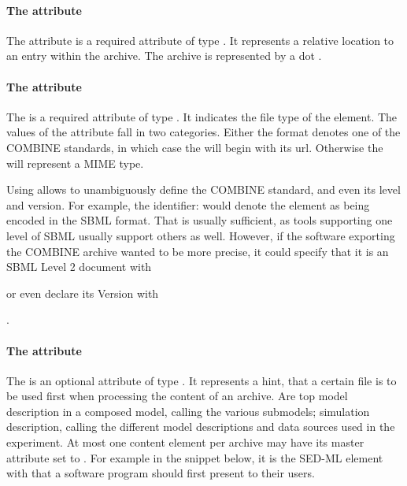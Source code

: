 \paragraph{The  attribute}
The  attribute is a required attribute of type 
. It represents a relative location to an entry within the 
archive. The archive is represented by a dot . 

\paragraph{The  attribute}
The  is a required attribute of type . It 
indicates the file type of the \Content element. The values of the 
 attribute fall in two categories. Either the format 
denotes one of the COMBINE standards, in which case the  
will begin with its  url. Otherwise the 
 will represent a MIME type. 

Using  allows to unambiguously define the COMBINE standard, and even its level and version. For example, the identifier:  would denote the \Content 
element as being encoded in the SBML format. That is usually sufficient, as tools supporting one level of SBML usually
support others as well. However, if the software exporting the COMBINE archive wanted to be more precise, it could specify that it is an SBML Level 2 document with 

\begin{center}
\end{center}

or even declare its Version with 

\begin{center}
.
\end{center}


\paragraph{The  attribute}
\label{active_document}
The  is an optional attribute of type . It 
represents a hint, that a certain file is to be used first when 
processing the content of an archive. Are top model description in a 
composed model, calling the various submodels; simulation description, 
calling the different model descriptions and data sources used in the 
experiment. At most one content element per archive may have its master 
attribute set to . For example in the snippet below, it is the 
SED-ML element with  that a software 
program should first present to their users.

